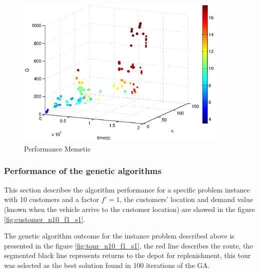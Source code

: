 \begin{figure}[!htbp]
  \begin{center}
   \includegraphics[width=0.9\textwidth]{Images/Chapter5/compare_expected_distance_memetic.eps}
  \end{center}
    \caption{Performance Memetic}\label{fig:compare_expected_distance_memetic}
\end{figure}

\subsubsection*{Performance of the genetic algorithms}

This section describes the algorithm performance for a specific problem instance with 10 customers and a factor $f'=1$, the customers' location and demand value (known when the vehicle arrive to the customer location) are showed in the figure \ref{fig:customer_n10_f1_s1}.



The genetic algorithm outcome for the instance problem described above is presented in the figure \ref{fig:tour_n10_f1_s1}, the red line describes the route, the segmented black line represents returns to the depot for replenishment, this tour was selected as the best solution found in 100 iterations of the GA.

